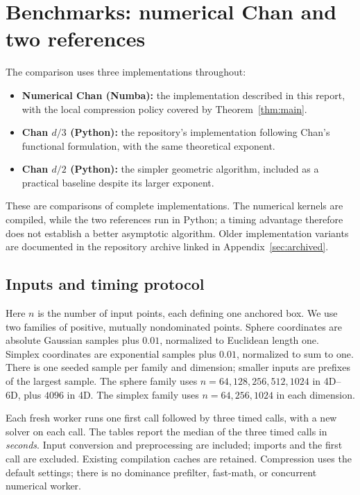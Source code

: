 \section{Benchmarks: numerical Chan and two references}
\label{sec:experiments}

The comparison uses three implementations throughout:
\begin{itemize}
\item \textbf{Numerical Chan (Numba):} the implementation described in this
report, with the local compression policy covered by Theorem~\ref{thm:main}.
\item \textbf{Chan $d/3$ (Python):} the repository's implementation following
Chan's functional formulation, with the same theoretical exponent.
\item \textbf{Chan $d/2$ (Python):} the simpler geometric algorithm, included
as a practical baseline despite its larger exponent.
\end{itemize}
These are comparisons of complete implementations. The numerical kernels
are compiled, while the two references run in Python; a timing advantage
therefore does not establish a better asymptotic algorithm.
Older implementation variants are documented in the repository archive
linked in Appendix~\ref{sec:archived}.

\subsection{Inputs and timing protocol}
Here $n$ is the number of input points, each defining one anchored box.
We use two families of positive, mutually nondominated points. Sphere
coordinates are absolute Gaussian samples plus $0.01$, normalized to
Euclidean length one. Simplex coordinates are exponential samples plus
$0.01$, normalized to sum to one. There is one seeded sample per family
and dimension; smaller inputs are prefixes of the largest sample.
The sphere family uses $n=64,128,256,512,1024$ in 4D--6D, plus $4096$ in
4D. The simplex family uses $n=64,256,1024$ in each dimension.

Each fresh worker runs one first call followed by three timed calls,
with a new solver on each call. The tables report the median of the
three timed calls in \emph{seconds}. Input conversion and preprocessing
are included; imports and the first call are excluded. Existing
compilation caches are retained. Compression uses the default settings;
there is no dominance prefilter, fast-math, or concurrent numerical worker.

